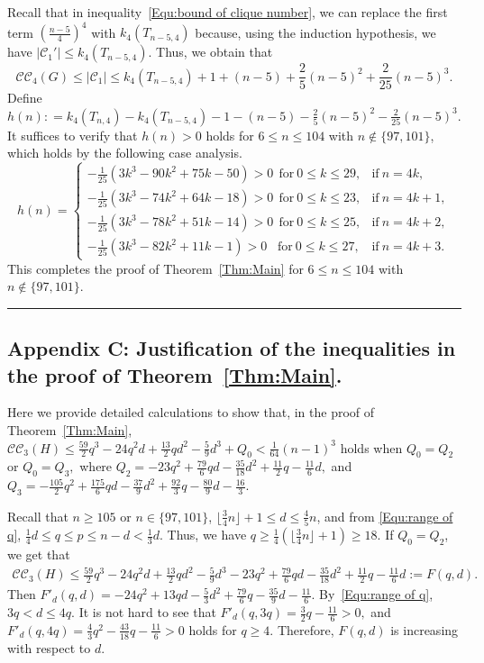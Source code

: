 \documentclass[11pt,a4paper]{article}
\def\QED{\hfill \rule{7pt}{7pt}}
\newcommand{\dC}{{\mathcal{C}}}
\newcommand{\turangraph}[2]{T_{#1,#2}}
\newcommand{\coveropt}[2]{{\mathcal{C}\mathcal{C}_{#1}(#2)}}
\begin{document}
Recall that in inequality~\eqref{Equ:bound of clique number}, 
we can replace the first term $(\frac{n-5}{4})^4$ with $k_4(\turangraph{n-5}{4})$ because, using the induction hypothesis, we have $|\mathcal{C}_1'|\le k_4(\turangraph{n-5}{4})$.
Thus, we obtain that
\begin{equation*}
	\mathcal{C}\mathcal{C}_4(G)
    \leq 
    |\dC_1|
    \leq k_4(\turangraph{n-5}{4}) + 1+(n-5)
	+\frac{2}{5}(n-5)^2
	+\frac{2}{25}(n-5)^3.
\end{equation*}
Define $h(n): = k_4(\turangraph{n}{4})-k_4(\turangraph{n-5}{4}) - 1-(n-5)
-\frac{2}{5}(n-5)^2-\frac{2}{25}(n-5)^3$. 
It suffices to verify that $h(n)>0$ holds for $6\leq n\leq 104$ with $n\notin\{97,101\}$, 
which holds by the following case analysis.
\vspace{-0.4cm}
$$h(n)=
	\begin{cases}
	-\frac{1}{25}(3k^3 - 90k^2 + 75k - 50)>0\ \ \text{for}\ 0\le k\le 29, &\text{if}\ n=4k, \\
	-\frac{1}{25}(3k^3 - 74k^2 + 64k - 18)>0\  \ \text{for}\ 0\le k\le 23, &\text{if}\ n=4k+1,\\
	-\frac{1}{25}(3k^3 - 78k^2 + 51k - 14)>0\ \  \text{for}\ 0\le k\le 25, &\text{if}\ n=4k+2,\\
    -\frac{1}{25}(3k^3 - 82k^2 + 11k - 1)>0\ \, \ \ \text{for}\ 0\le k\le 27, &\text{if}\ n=4k+3.
	\end{cases}
$$
This completes the proof of Theorem~\ref{Thm:Main} for $6 \leq n \leq 104$ with $n \not\in \{97,101\}$.
\QED


\subsection*{Appendix C: Justification of the inequalities in the proof of Theorem~\ref{Thm:Main}.}

Here we provide detailed calculations to show that, in the proof of Theorem~\ref{Thm:Main},
$\coveropt{3}{H}\le \frac{59}{2}q^3 -24q^2d +\frac{13}{2}qd^2 -\frac{5}{9}d^3+Q_0<\frac{1}{64}(n-1)^3$ holds when $Q_0=Q_2$ or $Q_0=Q_3,$ where 
$Q_2=-23q^2+\frac{79}{6}qd-\frac{35}{18}d^2+\frac{11}{2}q-\frac{11}{6}d,$ and 
$Q_3= -\frac{105}{2}q^2+\frac{175}{6}qd-\frac{37}{9}d^2+\frac{92}{3}q-\frac{80}{9}d-\frac{16}{3}.$

Recall that $n\geq 105$ or $n\in \{97,101\}$, $\lfloor \frac{3}{4}n \rfloor +1\leq d \leq \frac{4}{5}n$, and from \eqref{Equ:range of q},
$\frac 1 4 d\le q\le p\le n-d<\frac 1 3 d.$
Thus, we have $q\geq \frac 1 4 (\lfloor \frac{3}{4}n \rfloor +1)\geq 18$.
If $Q_0=Q_2$, we get that
\begin{align*}\label{Equ:CC3(H)<F1(q,d)}
\coveropt{3}{H} \leq	
\frac{59}{2}q^3 -24q^2d +\frac{13}{2}qd^2 -\frac{5}{9}d^3
-23q^2+\frac{79}{6}qd-\frac{35}{18}d^2+\frac{11}{2}q-\frac{11}{6}d:=F(q,d). 
\end{align*}
Then $F'_d(q,d)=-24q^2+13qd-\frac 5 3 d^2+\frac{79}{6} q -\frac{35}{9}d -\frac{11}{6}.$
By~\eqref{Equ:range of q}, $3q<d\le 4q.$
It is not hard to see that
$F'_d(q,3q)=\frac 3 2 q - \frac {11} 6 >0,$ and
$F'_d(q,4q)=\frac 4 3 q^2-\frac {43}{18} q - \frac {11} 6>0$
holds for $q\geq 4.$
Therefore, $F(q,d)$ is increasing with respect to $d.$ 
\end{document}
